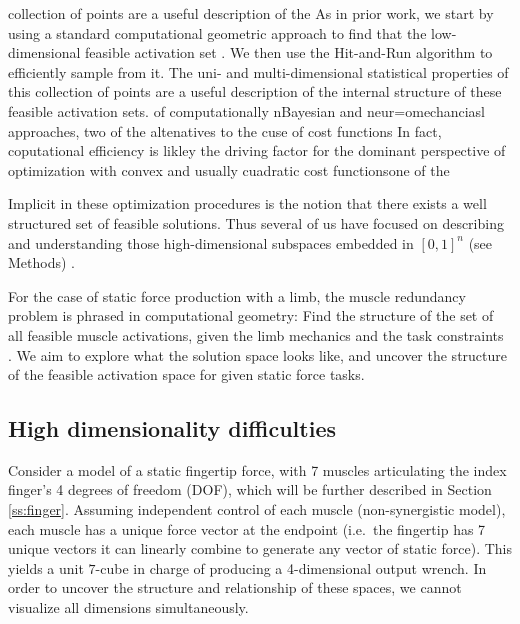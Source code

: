   collection of points are a useful description of the  As in prior work, we  start by using a standard computational geometric approach to find that the low-dimensional feasible activation set \cite{valero2015fundamentals}. We then use  the Hit-and-Run algorithm \cite{smith1984efficient} to efficiently sample from it. The uni- and multi-dimensional statistical properties of this  collection of points are a useful description of the internal structure of these feasible activation sets.
of computationally  nBayesian and neur=omechanciasl approaches, two of the altenatives to the cuse of cost functions In fact, coputational efficiency is likley the driving factor for the dominant perspective of optimization with convex and usually cuadratic cost functionsone of the 


Implicit in these optimization procedures is the notion that there exists a well structured set of feasible solutions. Thus several of us have focused on describing and understanding those high-dimensional subspaces  embedded in $[0,1]^n$ (see Methods) \cite{kutch2011muscle,kutch2012challenges,sohn2013cat_bounding_box,Valero-Cuevas1998Large,Valero-Cuevas2015high-dimensional}.

For the case of static force production with a limb, the muscle redundancy problem is phrased in computational geometry: Find the structure of the set of all feasible muscle activations, given the limb mechanics and the task constraints \cite{avis1992Pivoting,Valero-Cuevas1998Large,Valero-Cuevas2009mathematical,Valero-Cuevas2015high-dimensional}.
We aim to explore what the solution space looks like, and uncover the structure of the feasible activation space for given static force tasks.

\subsection*{High dimensionality difficulties}
Consider a model of a static fingertip force, with 7 muscles articulating the index finger's 4 degrees of freedom (DOF), which will be further described in Section \ref{ss:finger}.
Assuming independent control of each muscle (non-synergistic model), each muscle has a unique force vector at the endpoint (i.e.\ the fingertip has 7 unique vectors it can linearly combine to generate any vector of static force).
This yields a unit $7$-cube in charge of producing a 4-dimensional output wrench.
In order to uncover the structure and relationship of these spaces, we cannot visualize all dimensions simultaneously. %

